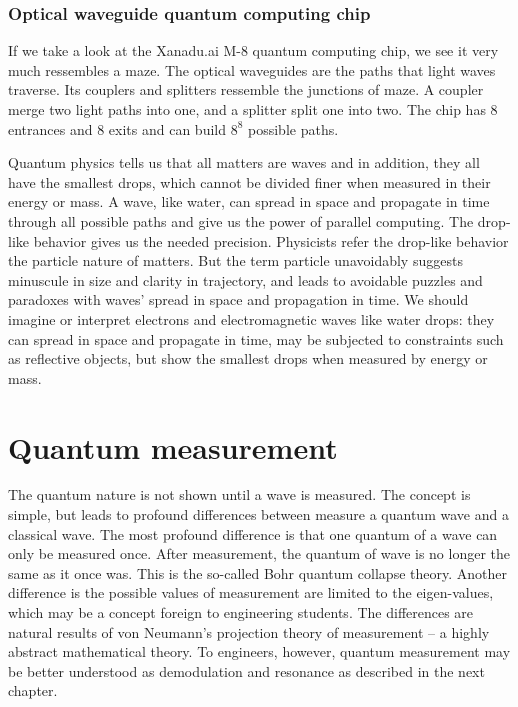 \documentclass{book}
\begin{document}



\subsubsection{Optical waveguide quantum computing chip}
If we take a look at the Xanadu.ai M-8 quantum computing chip, we see it very much ressembles a maze. The optical waveguides are the paths that light waves traverse. Its couplers and splitters ressemble the junctions of maze. A coupler merge two light paths into one, and a splitter split one into two. The chip has 8 entrances and 8 exits and can build $8^8$ possible paths.

Quantum physics tells us that all matters are waves and in addition, they all have the smallest drops, which cannot be divided finer when measured in their energy or mass. A wave, like water, can spread in space and propagate in time through all possible paths and give us the power of parallel computing. The drop-like behavior gives us the needed precision. Physicists refer the drop-like behavior the particle nature of matters. But the term particle unavoidably suggests minuscule in size and clarity in trajectory, and leads to avoidable puzzles and paradoxes with waves' spread in space and propagation in time. We should imagine or interpret electrons and electromagnetic waves like water drops: they can spread in space and propagate in time, may be subjected to constraints such as reflective objects, but show the smallest drops when measured by energy or mass.

\section{Quantum measurement}
The quantum nature is not shown until a wave is measured. The concept is simple, but leads to profound differences between measure a quantum wave and a classical wave. The most profound difference is that one quantum of a wave can only be measured once. After measurement, the quantum of wave is no longer the same as it once was. This is the so-called Bohr quantum collapse theory. Another difference is the possible values of measurement are limited to the eigen-values, which may be a concept foreign to engineering students. The differences are natural results of von Neumann's projection theory of measurement -- a highly abstract mathematical theory. To engineers, however, quantum measurement may be better understood as demodulation and resonance as described in the next chapter. 
\end{document}
